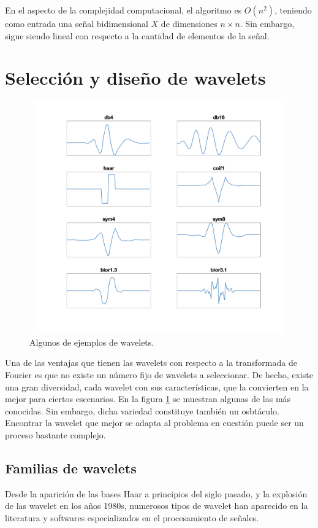 En el aspecto de la complejidad computacional, el algoritmo es $O(n^2)$, teniendo como entrada
una señal bidimensional $X$ de dimensiones  $n \times n $. Sin embargo, sigue siendo lineal con respecto a la cantidad
de elementos de la señal.

\section{Selección y diseño de wavelets}\label{design-selection-wavelets}

\begin{figure}[!h]
	\includegraphics[width=15cm,height=10cm]{Graphics/wavelets.png}
	\caption{Algunos de ejemplos de wavelets.}\label{fig:wavelets}
\end{figure}

Una de las ventajas que tienen las wavelets con respecto a la transformada de Fourier es que no existe un número fijo
de wavelets a seleccionar. De hecho, existe una gran diversidad, cada wavelet con sus características, que 
la convierten en la mejor para ciertos escenarios. En la figura \ref{fig:wavelets} se muestran algunas de las
más conocidas. Sin embargo, dicha variedad constituye también un osbtáculo.
Encontrar la wavelet que mejor se adapta al problema en cuestión puede ser un proceso bastante complejo.

\subsection{Familias de wavelets}\label{wavelets-families}

Desde la aparición de las bases Haar a principios del siglo pasado, y la explosión de las wavelet en los 
años 1980s, numerosos tipos de wavelet han aparecido en la literatura y softwares especializados en el 
procesamiento de señales. 

